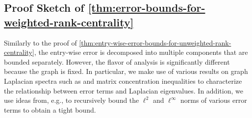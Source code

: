 \documentclass[sigconf,nonacm,pbalance]{acmart}
\begin{document}
\subsection{Proof Sketch of \cref{thm:error-bounds-for-weighted-rank-centrality}}\label{sec:proof-sketch-weighted}
Similarly to the proof of \cref{thm:entry-wise-error-bounds-for-unweighted-rank-centrality}, the entry-wise error is decomposed into multiple components that are bounded separately. However, the flavor of analysis is significantly different because the graph is fixed. In particular, we make use of various results on graph Laplacian spectra such as \cite[Lemma 18]{MonotoneAdversary} and matrix concentration inequalities \cite{Tropp2015} to characterize the relationship between error terms and Laplacian eigenvalues. In addition, we use ideas from, e.g., \cite{SpectralonGeneralMultiway} to recursively bound the $\ell^2$ and $\ell^\infty$ norms of various error terms to obtain a tight bound.
\end{document}
